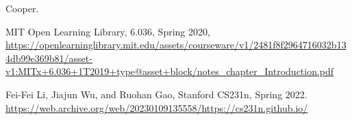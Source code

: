 \documentclass[11pt]{article}
\numberwithin{equation}{section}
\theoremstyle{definition}%
\begin{document}
\begin{thebibliography}{2}
     Cooper.

     {MIT Open Learning Library, 6.036, Spring 2020, \url{https://openlearninglibrary.mit.edu/assets/courseware/v1/2481f8f2964716032b134db99e369b81/asset-v1:MITx+6.036+1T2019+type@asset+block/notes_chapter_Introduction.pdf}}

     Fei-Fei Li, Jiajun Wu, and Ruohan Gao, Stanford CS231n, Spring 2022. \url{https://web.archive.org/web/20230109135558/https://cs231n.github.io/}

\end{thebibliography}
\end{document}
